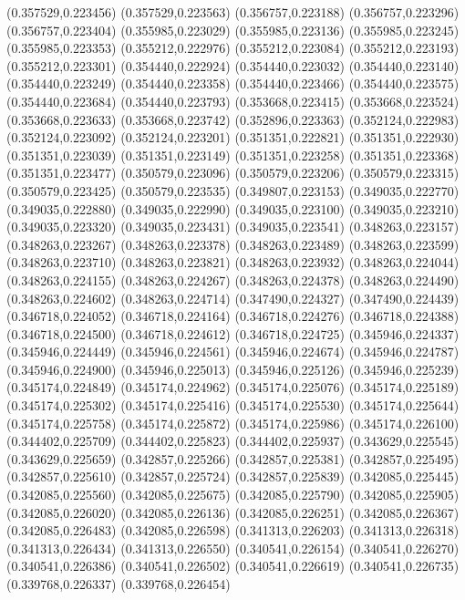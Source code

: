 (0.357529,0.223456)
(0.357529,0.223563)
(0.356757,0.223188)
(0.356757,0.223296)
(0.356757,0.223404)
(0.355985,0.223029)
(0.355985,0.223136)
(0.355985,0.223245)
(0.355985,0.223353)
(0.355212,0.222976)
(0.355212,0.223084)
(0.355212,0.223193)
(0.355212,0.223301)
(0.354440,0.222924)
(0.354440,0.223032)
(0.354440,0.223140)
(0.354440,0.223249)
(0.354440,0.223358)
(0.354440,0.223466)
(0.354440,0.223575)
(0.354440,0.223684)
(0.354440,0.223793)
(0.353668,0.223415)
(0.353668,0.223524)
(0.353668,0.223633)
(0.353668,0.223742)
(0.352896,0.223363)
(0.352124,0.222983)
(0.352124,0.223092)
(0.352124,0.223201)
(0.351351,0.222821)
(0.351351,0.222930)
(0.351351,0.223039)
(0.351351,0.223149)
(0.351351,0.223258)
(0.351351,0.223368)
(0.351351,0.223477)
(0.350579,0.223096)
(0.350579,0.223206)
(0.350579,0.223315)
(0.350579,0.223425)
(0.350579,0.223535)
(0.349807,0.223153)
(0.349035,0.222770)
(0.349035,0.222880)
(0.349035,0.222990)
(0.349035,0.223100)
(0.349035,0.223210)
(0.349035,0.223320)
(0.349035,0.223431)
(0.349035,0.223541)
(0.348263,0.223157)
(0.348263,0.223267)
(0.348263,0.223378)
(0.348263,0.223489)
(0.348263,0.223599)
(0.348263,0.223710)
(0.348263,0.223821)
(0.348263,0.223932)
(0.348263,0.224044)
(0.348263,0.224155)
(0.348263,0.224267)
(0.348263,0.224378)
(0.348263,0.224490)
(0.348263,0.224602)
(0.348263,0.224714)
(0.347490,0.224327)
(0.347490,0.224439)
(0.346718,0.224052)
(0.346718,0.224164)
(0.346718,0.224276)
(0.346718,0.224388)
(0.346718,0.224500)
(0.346718,0.224612)
(0.346718,0.224725)
(0.345946,0.224337)
(0.345946,0.224449)
(0.345946,0.224561)
(0.345946,0.224674)
(0.345946,0.224787)
(0.345946,0.224900)
(0.345946,0.225013)
(0.345946,0.225126)
(0.345946,0.225239)
(0.345174,0.224849)
(0.345174,0.224962)
(0.345174,0.225076)
(0.345174,0.225189)
(0.345174,0.225302)
(0.345174,0.225416)
(0.345174,0.225530)
(0.345174,0.225644)
(0.345174,0.225758)
(0.345174,0.225872)
(0.345174,0.225986)
(0.345174,0.226100)
(0.344402,0.225709)
(0.344402,0.225823)
(0.344402,0.225937)
(0.343629,0.225545)
(0.343629,0.225659)
(0.342857,0.225266)
(0.342857,0.225381)
(0.342857,0.225495)
(0.342857,0.225610)
(0.342857,0.225724)
(0.342857,0.225839)
(0.342085,0.225445)
(0.342085,0.225560)
(0.342085,0.225675)
(0.342085,0.225790)
(0.342085,0.225905)
(0.342085,0.226020)
(0.342085,0.226136)
(0.342085,0.226251)
(0.342085,0.226367)
(0.342085,0.226483)
(0.342085,0.226598)
(0.341313,0.226203)
(0.341313,0.226318)
(0.341313,0.226434)
(0.341313,0.226550)
(0.340541,0.226154)
(0.340541,0.226270)
(0.340541,0.226386)
(0.340541,0.226502)
(0.340541,0.226619)
(0.340541,0.226735)
(0.339768,0.226337)
(0.339768,0.226454)
